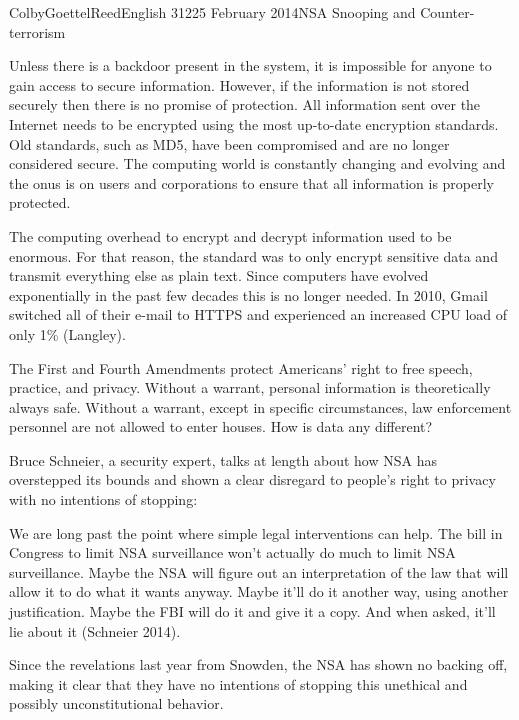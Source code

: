 \documentclass[12pt]{article}
\begin{document}
\begin{mla}{Colby}{Goettel}{Reed}{English 312}{25 February 2014}{NSA Snooping and Counter-terrorism}


Unless there is a backdoor present in the system, it is impossible for anyone to gain access to secure information. However, if the information is not stored securely then there is no promise of protection. All information sent over the Internet needs to be encrypted using the most up-to-date encryption standards. Old standards, such as MD5, have been compromised and are no longer considered secure. The computing world is constantly changing and evolving and the onus is on users and corporations to ensure that all information is properly protected.

The computing overhead to encrypt and decrypt information used to be enormous. For that reason, the standard was to only encrypt sensitive data and transmit everything else as plain text. Since computers have evolved exponentially in the past few decades this is no longer needed. In 2010, Gmail switched all of their e-mail to HTTPS and experienced an increased CPU load of only 1\% (Langley).

The First and Fourth Amendments protect Americans' right to free speech, practice, and privacy. Without a warrant, personal information is theoretically always safe. Without a warrant, except in specific circumstances, law enforcement personnel are not allowed to enter houses. How is data any different?

Bruce Schneier, a security expert, talks at length about how NSA has overstepped its bounds and shown a clear disregard to people's right to privacy with no intentions of stopping:
\begin{mlaquote}
    We are long past the point where simple legal interventions can help. The bill in Congress to limit NSA surveillance won't actually do much to limit NSA surveillance. Maybe the NSA will figure out an interpretation of the law that will allow it to do what it wants anyway. Maybe it'll do it another way, using another justification. Maybe the FBI will do it and give it a copy. And when asked, it'll lie about it (Schneier 2014).
\end{mlaquote}
Since the revelations last year from Snowden, the NSA has shown no backing off, making it clear that they have no intentions of stopping this unethical and possibly unconstitutional behavior.


\end{mla}
\end{document}
